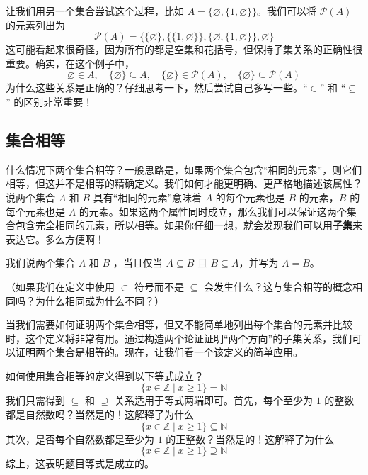 \begin{example}
    让我们用另一个集合尝试这个过程，比如 $A = \{\varnothing, \{1, \varnothing\}\}$。我们可以将 $\mathcal{P}(A)$ 的元素列出为
    \[\mathcal{P}(A) = \{\{\varnothing\}, \{\{1, \varnothing\}\}, \{\varnothing, \{1, \varnothing\}\}, \varnothing \}\]
    这可能看起来很奇怪，因为所有的都是空集和花括号，但保持子集关系的正确性很重要。确实，在这个例子中，
    \[\varnothing \in A, \quad \{\varnothing\} \subseteq A, \quad \{\varnothing\} \in \mathcal{P}(A), \quad \{\varnothing\} \subseteq \mathcal{P}(A)\]
    为什么这些关系是正确的？仔细思考一下，然后尝试自己多写一些。``$\in$'' 和 ``$\subseteq$'' 的区别非常重要！
\end{example}

\subsection{集合相等}

什么情况下两个集合相等？一般思路是，如果两个集合包含``相同的元素''，则它们相等，但这并不是相等的精确定义。我们如何才能更明确、更严格地描述该属性？说两个集合 $A$ 和 $B$ 具有``相同的元素''意味着 $A$ 的每个元素也是 $B$ 的元素，$B$ 的每个元素也是 $A$ 的元素。如果这两个属性同时成立，那么我们可以保证这两个集合包含完全相同的元素，所以相等。如果你仔细一想，就会发现我们可以用\textbf{子集}来表达它。多么方便啊！

\begin{definition}
    我们说两个集合 $A$ 和 $B$ ，当且仅当 $A \subseteq B$ 且 $B \subseteq A$，并写为 $A = B$。
\end{definition}
（如果我们在定义中使用 $\subset$ 符号而不是 $\subseteq$ 会发生什么？这与集合相等的概念相同吗？为什么相同或为什么不同？）

当我们需要如何证明两个集合相等，但又不能简单地列出每个集合的元素并比较时，这个定义将非常有用。通过构造两个论证证明``两个方向''的子集关系，我们可以证明两个集合是相等的。现在，让我们看一个该定义的简单应用。

\begin{example}
    如何使用集合相等的定义得到以下等式成立？
    \[\{x \in \mathbb{Z} \mid x \ge 1\} = \mathbb{N}\]
    我们只需得到 $\subseteq$ 和 $\supseteq$ 关系适用于等式两端即可。首先，每个至少为 $1$ 的整数都是自然数吗？当然是的！这解释了为什么
    \[\{x \in \mathbb{Z} \mid x \ge 1\} \subseteq \mathbb{N}\]
    其次，是否每个自然数都是至少为 $1$ 的正整数？当然是的！这解释了为什么
    \[\{x \in \mathbb{Z} \mid x \ge 1\} \supseteq \mathbb{N}\]
    综上，这表明题目等式是成立的。
\end{example}

